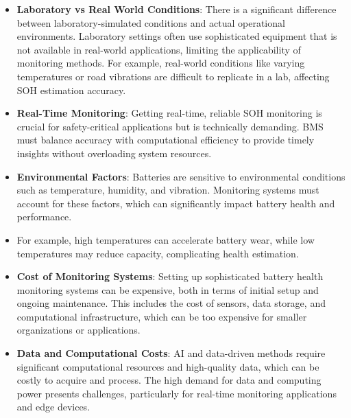 \begin{itemize}
    \item \textbf{Laboratory vs Real World Conditions}: There is a significant difference between laboratory-simulated conditions and actual operational environments. Laboratory settings often use sophisticated equipment that is not available in real-world applications, limiting the applicability of monitoring methods. For example, real-world conditions like varying temperatures or road vibrations are difficult to replicate in a lab, affecting SOH estimation accuracy.
    \item \textbf{Real-Time Monitoring}: Getting real-time, reliable SOH monitoring is crucial for safety-critical applications but is technically demanding. BMS must balance accuracy with computational efficiency to provide timely insights without overloading system resources.
    \item \textbf{Environmental Factors}: Batteries are sensitive to environmental conditions such as temperature, humidity, and vibration. Monitoring systems must account for these factors, which can significantly impact battery health and performance.
    \item For example, high temperatures can accelerate battery wear, while low temperatures may reduce capacity, complicating health estimation.
    \item \textbf{Cost of Monitoring Systems}: Setting up sophisticated battery health monitoring systems can be expensive, both in terms of initial setup and ongoing maintenance. This includes the cost of sensors, data storage, and computational infrastructure, which can be too expensive for smaller organizations or applications.
    \item \textbf{Data and Computational Costs}: AI and data-driven methods require significant computational resources and high-quality data, which can be costly to acquire and process. The high demand for data and computing power presents challenges, particularly for real-time monitoring applications and edge devices.
\end{itemize}



